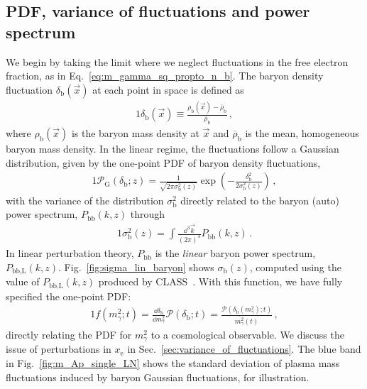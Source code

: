 \documentclass[prd,aps,10pt,nofootinbib,twocolumn,superscriptaddress,preprintnumbers,balancelastpage,longbibliography]{revtex4-1}
\begin{document}
\subsection{PDF, variance of fluctuations and power spectrum}

We begin by taking the limit where we neglect fluctuations in the free electron fraction, as in Eq.~\eqref{eq:m_gamma_sq_propto_n_b}. The baryon density fluctuation $\delta_\text{b}(\vec{x})$ at each point in space is defined as
%
\begin{alignat}{1}
    \delta_\text{b}(\vec{x}) \equiv \frac{\rho_\text{b}(\vec{x}) - \overline{\rho}_\text{b}}{\overline{\rho}_\text{b}} \,,
\end{alignat}
%
where $\rho_\text{b}(\vec{x})$ is the baryon mass density at $\vec{x}$ and $\overline{\rho}_\text{b}$ is the mean, homogeneous baryon mass density. In the linear regime, the fluctuations follow a Gaussian distribution, given by the one-point PDF of baryon density fluctuations,
%
\begin{alignat}{1}
    \mathcal{P}_\text{G}(\delta_\text{b};z) = \frac{1}{\sqrt{2\pi \sigma_\text{b}^2(z)}} \exp \left(- \frac{\delta_\text{b}^2}{2 \sigma_\text{b}^2(z)}\right) \,,
    \label{eq:gaussian_pdf}
\end{alignat}
%
with the variance of the distribution $\sigma_\text{b}^2$ directly related to the baryon (auto) power spectrum, $P_\text{bb}(k,z)$ through
%
\begin{alignat}{1}
    \sigma_\text{b}^2(z) = \int \frac{\dd^3 \vec{k}}{(2\pi)^3} P_\text{bb}(k,z) \,.
    \label{eq:sigma_sq_def}
\end{alignat}
%
 In linear perturbation theory, $P_\text{bb}$ is the \textit{linear} baryon power spectrum, $P_\text{bb,L}(k,z)$. Fig.~\ref{fig:sigma_lin_baryon} shows $\sigma_\text{b}(z)$, computed using the value of $P_\text{bb,L}(k,z)$  produced by CLASS~\cite{Blas:2011rf}. With this function, we have fully specified the one-point PDF:
%
\begin{alignat}{1}
    f(m_\gamma^2;t) = \frac{\dd \delta_\text{b}}{\dd m_\gamma^2} \mathcal{P}(\delta_\text{b};t) = \frac{\mathcal{P}(\delta_\text{b}(m_\gamma^2); t)}{\overline{m_\gamma^2}(t)} \,,
    \label{eq:f_from_one_pt_PDF}
\end{alignat}
%
directly relating the PDF for $m_\gamma^2$ to a cosmological observable. We discuss the issue of perturbations in $x_\text{e}$ in Sec.~\ref{sec:variance_of_fluctuations}. The blue band in Fig.~\ref{fig:m_Ap_single_LN} shows the standard deviation of plasma mass fluctuations induced by baryon Gaussian fluctuations, for illustration.
\end{document}
